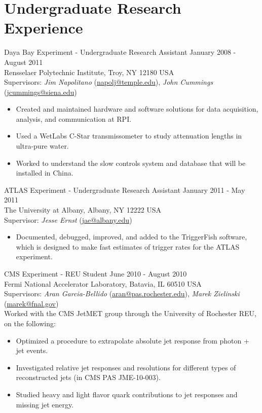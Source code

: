 \section{Undergraduate Research Experience}
Daya Bay Experiment - Undergraduate Research Assistant \hfill January 2008 - August 2011\\
Rensselaer Polytechnic Institute, Troy, NY 12180 USA\\
Supervisors: {\sl Jim Napolitano} (\href{mailto:napolj@temple.edu}{napolj@temple.edu}), {\sl John Cummings} (\href{mailto:jcummings@siena.edu}{jcummings@siena.edu})
\begin{itemize}[leftmargin=12pt]
\item Created and maintained hardware and software solutions for data acquisition, analysis, and communication at RPI.
\item Used a WetLabs C-Star transmissometer to study attenuation lengths in ultra-pure water.
\item Worked to understand the slow controls system and database that will be installed in China.
\end{itemize}
ATLAS Experiment - Undergraduate Research Assistant \hfill January 2011 - May 2011\\
The University at Albany, Albany, NY 12222 USA\\
Supervisor: {\sl Jesse Ernst} (\href{mailto:jae@albany.edu}{jae@albany.edu})
\begin{itemize}[leftmargin=12pt]
\item Documented, debugged, improved, and added to the TriggerFish software, which is designed to make fast estimates of trigger rates for the ATLAS experiment.
\end{itemize}
CMS Experiment - REU Student \hfill June 2010 - August 2010\\
Fermi National Accelerator Laboratory, Batavia, IL 60510 USA\\
Supervisors: {\sl Aran Garcia-Bellido} (\href{mailto:aran@pas.rochester.edu}{aran@pas.rochester.edu}), {\sl Marek Zielinski} (\href{mailto:marek@fnal.gov}{marek@fnal.gov})\\
Worked with the CMS JetMET group through the University of Rochester REU, on the following:
\begin{itemize}[leftmargin=12pt]
\item Optimized a procedure to extrapolate absolute jet response from photon + jet events.
\item Investigated relative jet responses and resolutions for different types of reconstructed jets (in CMS PAS JME-10-003).
\item Studied heavy and light flavor quark contributions to jet responses and missing jet energy.
\end{itemize}
